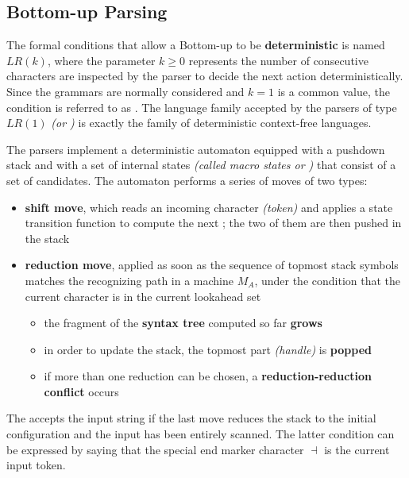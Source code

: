 \documentclass[english]{article}
\begin{document}
\subsection{Bottom-up Parsing}

The formal conditions that allow a Bottom-up to be \textbf{deterministic} is named \(\textit{LR}(k)\), where the parameter \(k \geq 0\) represents the number of consecutive characters are inspected by the parser to decide the next action deterministically.
Since the \EBNF grammars are normally considered and \(k=1\) is a common value, the condition is referred to as \elro.
The language family accepted by the parsers of type \(\textit{LR}(1)\) \textit{(or \elro)} is exactly the family \DET of deterministic context-free languages.

The \elro parsers implement a deterministic automaton equipped with a pushdown stack and with a set of internal states \textit{(called macro states or \mstates)} that consist of a set of candidates.
The automaton performs a series of moves of two types:

\begin{itemize}
  \item \textbf{shift move}, which reads an incoming character \textit{(token)} and applies a state transition function to compute the next \mstate; the two of them are then pushed in the stack
  \item \textbf{reduction move}, applied as soon as the sequence of topmost stack symbols matches the recognizing path in a machine \(M_A\), under the condition that the current character is in the current lookahead set
        \begin{itemize}[label=\(\rightarrow\)]
          \item the fragment of the \textbf{syntax tree} computed so far \textbf{grows}
          \item in order to update the stack, the topmost part \textit{(handle)} is \textbf{popped}
          \item if more than one reduction can be chosen, a \textbf{reduction-reduction conflict} occurs
        \end{itemize}
\end{itemize}

The \PDA accepts the input string if the last move reduces the stack to the initial configuration and the input has been entirely scanned.
The latter condition can be expressed by saying that the special end marker character \(\dashv\) is the current input token.
\end{document}
